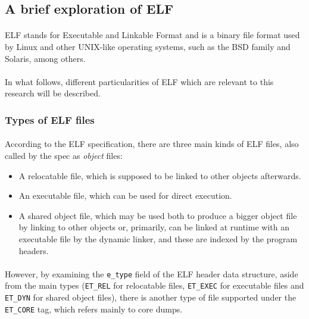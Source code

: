 \documentclass[12pt]{article}
\begin{document}
	\subsection{A brief exploration of ELF}
	
	\paragraph{}ELF stands for Executable and Linkable Format and is a binary file format used by Linux and other UNIX-like operating systems, such as the BSD family and Solaris, among others.
	\paragraph{}In what follows, different particularities of ELF which are relevant to this research will be described.
	
	\subsubsection{Types of ELF files}
	
	\paragraph{}According to the ELF specification\cite{elf-spec}, there are three main kinds of ELF files, also called by the spec as \textit{object} files:
	\begin{itemize}
		\item A relocatable file, which is supposed to be linked to other objects afterwards.
		\item An executable file, which can be used for direct execution.
		\item A shared object file, which may be used both to produce a bigger object file by linking to other objects or, primarily, can be linked at runtime with an executable file by the dynamic linker, and these are indexed by the program headers.
	\end{itemize}
	\paragraph{}However, by examining the \verb|e_type| field of the ELF header data structure, aside from the main types (\verb|ET_REL| for relocatable files, \verb|ET_EXEC| for executable files and \verb|ET_DYN| for shared object files), there is another type of file supported under the \verb|ET_CORE| tag, which refers mainly to core dumps.
	
\end{document}
